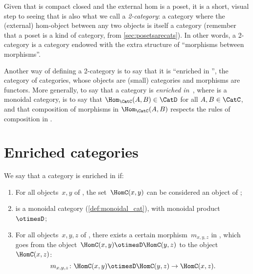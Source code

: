 Given that \DP is compact closed and the external hom is a poset, it is a short, visual step to seeing that \DP is also what we call a \emph{2-category}: a category where the (external) hom-object between any two objects is itself a category (remember that a poset is a kind of category, from \cref{sec:posetsarecats}). In other words, a 2-category is a category endowed with the extra structure of ``morphisms between morphisms''.

Another way of defining a 2-category is to say that it is ``enriched in \Category'', the category of categories, whose objects are (small) categories and morphisms are functors. More generally, to say that a category \CatC is \emph{enriched in~\CatD}, where \CatD is a monoidal category, is to say that $\Hom_\CatC(A,B) \in \CatD$ for all $A,B \in \CatC$, and that composition of morphisms in $\Hom_\CatC(A,B)$ respects the rules of composition in \CatD.


\section{Enriched categories}

\begin{ctdefinition}
    We say that a category \CatC is enriched in \CatD if:
    \begin{enumerate}
        \item For all objects~$x, y$ of \CatC, the set~$\HomC(x,y)$ can be considered an object of \CatD;
        \item \CatD is a monoidal category (\cref{def:monoidal_cat}),
        with monoidal product~$\otimesD$;
        \item For all objects~$x, y, z$ of \CatC, there exists
        a certain morphism~$m_{x,y,z}$ in \CatD,
        which goes from the object~$\HomC(x, y) \otimesD \HomC(y, z)$ to the object~$\HomC(x, z)$:
        \begin{equation}
            \label{eq:enriched-condition}
            m_{x,y,z} \colon \HomC(x, y) \otimesD \HomC(y, z) \to \HomC(x, z).
        \end{equation}
    \end{enumerate}
\end{ctdefinition}

%

